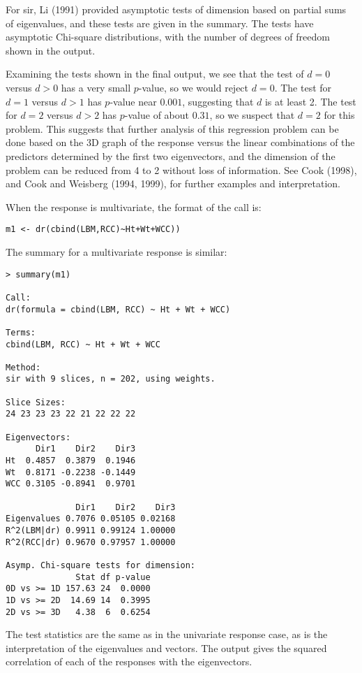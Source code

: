 \documentclass{article}
\newcommand{\sir}{{\sffamily sir}}
\begin{document}
For \sir, Li (1991) provided asymptotic tests of dimension based on partial
sums of eigenvalues, and these tests are given in the summary.  The tests
have asymptotic Chi-square distributions, with the number of degrees of
freedom shown in the output.

Examining the tests shown in the final output, we see that the
test of $d=0$ versus $d>0$ has a very small $p$-value, so we would
reject $d=0$.  The test for $d=1$ versus $d>1$ has $p$-value near
$0.001$, suggesting that $d$ is at least 2.  The test for $d=2$
versus $d>2$ has $p$-value of about $0.31$, so we suspect that
$d=2$ for this problem.  This suggests that further analysis of
this regression problem can be done based on the 3D graph of the
response versus the linear combinations of the predictors
determined by the first two eigenvectors, and the dimension of the
problem can be reduced from 4 to 2 without loss of information.
See Cook (1998), and Cook and Weisberg (1994, 1999), for further
examples and interpretation.

When the response is multivariate, the format of the call is:
\small\begin{verbatim}
m1 <- dr(cbind(LBM,RCC)~Ht+Wt+WCC))
\end{verbatim}
\normalsize
The summary for a multivariate response is similar:
\small \begin{verbatim}
> summary(m1)

Call:
dr(formula = cbind(LBM, RCC) ~ Ht + Wt + WCC)

Terms:
cbind(LBM, RCC) ~ Ht + Wt + WCC

Method:
sir with 9 slices, n = 202, using weights.

Slice Sizes:
24 23 23 23 22 21 22 22 22

Eigenvectors:
      Dir1    Dir2    Dir3
Ht  0.4857  0.3879  0.1946
Wt  0.8171 -0.2238 -0.1449
WCC 0.3105 -0.8941  0.9701

              Dir1    Dir2    Dir3
Eigenvalues 0.7076 0.05105 0.02168
R^2(LBM|dr) 0.9911 0.99124 1.00000
R^2(RCC|dr) 0.9670 0.97957 1.00000

Asymp. Chi-square tests for dimension:
              Stat df p-value
0D vs >= 1D 157.63 24  0.0000
1D vs >= 2D  14.69 14  0.3995
2D vs >= 3D   4.38  6  0.6254
\end{verbatim}
\normalsize
The test statistics are the same as in the univariate response case, as is
the interpretation of the eigenvalues and vectors.  The output gives the
squared correlation of each of the responses with the eigenvectors.
\end{document}
